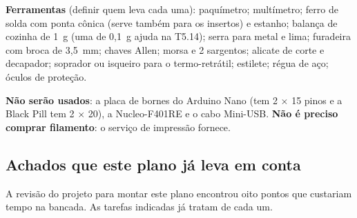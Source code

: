 \documentclass[11pt,a4paper]{article}
\begin{document}
\textbf{Ferramentas} (definir quem leva cada uma): paquímetro; multímetro; ferro de solda com
ponta cônica (serve também para os insertos) e estanho; balança de cozinha de 1~g (uma de
0,1~g ajuda na T5.14); serra para metal e lima; furadeira com broca de 3,5~mm; chaves Allen;
morsa e 2 sargentos; alicate de corte e decapador; soprador ou isqueiro para o
termo-retrátil; estilete; régua de aço; óculos de proteção.

\textbf{Não serão usados}: a placa de bornes do Arduino Nano (tem 2 $\times$ 15 pinos e a
Black Pill tem 2 $\times$ 20), a Nucleo-F401RE e o cabo Mini-USB. \textbf{Não é preciso
comprar filamento}: o serviço de impressão fornece.

\subsection{Achados que este plano já leva em conta}
\label{sec:achados}

A revisão do projeto para montar este plano encontrou oito pontos que custariam tempo na
bancada. As tarefas indicadas já tratam de cada um.
\end{document}
